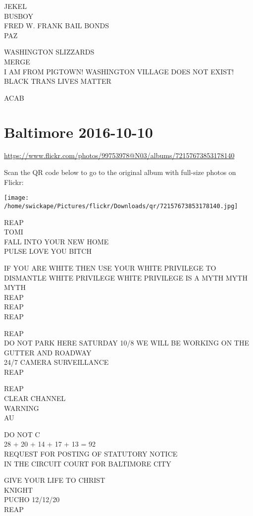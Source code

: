 \documentclass[10pt,letterpaper]{article}
\begin{document}
JEKEL\\
BUSBOY\\
FRED W. FRANK BAIL BONDS\\
PAZ

WASHINGTON SLIZZARDS\\
MERGE\\
I AM FROM PIGTOWN!  WASHINGTON VILLAGE DOES NOT EXIST!\\
BLACK TRANS LIVES MATTER

ACAB


\section*{Baltimore 2016-10-10}

\url{https://www.flickr.com/photos/99753978@N03/albums/72157673853178140}

Scan the QR code below to go to the original album with full-size photos on Flickr:

\texttt{[image: /home/swickape/Pictures/flickr/Downloads/qr/72157673853178140.jpg]}


REAP\\
TOMI\\
FALL INTO YOUR NEW HOME\\
PULSE LOVE YOU BITCH

IF YOU ARE WHITE THEN USE YOUR WHITE PRIVILEGE TO DISMANTLE WHITE PRIVILEGE WHITE PRIVILEGE IS A MYTH MYTH MYTH\\
REAP\\
REAP\\
REAP

REAP\\
DO NOT PARK HERE SATURDAY 10/8 WE WILL BE WORKING ON THE GUTTER AND ROADWAY\\
24/7 CAMERA SURVEILLANCE\\
REAP

REAP\\
CLEAR CHANNEL\\
WARNING\\
AU

DO NOT C\\
28 + 20 + 14 + 17 + 13 = 92\\
REQUEST FOR POSTING OF STATUTORY NOTICE\\
IN THE CIRCUIT COURT FOR BALTIMORE CITY

GIVE YOUR LIFE TO CHRIST\\
KNIGHT\\
PUCHO 12/12/20\\
REAP
\end{document}
